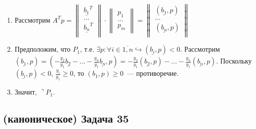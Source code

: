 \documentclass[a4paper]{article}
\begin{document}
\begin{enumerate}
\begin{enumerate}
\item Рассмотрим $A^Tp=\begin{Vmatrix}
\underline{b_1}^T\\
...\\
\underline{b_n}^T\\
\end{Vmatrix}\cdot\begin{Vmatrix}
p_1\\
...\\
p_m
\end{Vmatrix}=\begin{Vmatrix}
(\underline{b_1},p)\\
...\\
(\underline{b_n},p)\\
\end{Vmatrix}$
\item Предположим, что $P_1$, т.е. $\exists p\colon\forall i\in\overline{1,n}\hookrightarrow (\underline{b_i},p)<0$.\newline
Рассмотрим $(\underline{b_1},p)=(-\frac{y_2}{y_1}\underline{b_2}-...-\frac{y_n}{y_1}\underline{b_n},p)=-\frac{y_2}{y_1}(\underline{b_2},p)-...-\frac{y_n}{y_1}(\underline{b_n},p)$. Поскольку $(\underline{b_i},p)<0$, $\frac{y_i}{y_1}\geqslant 0$, то $(b_1,p)\geqslant 0$~--- противоречие.
\item Значит, $\urcorner P_1$.
\end{enumerate}
\end{enumerate}
\subsection*{(каноническое) Задача 35}
\end{document}
